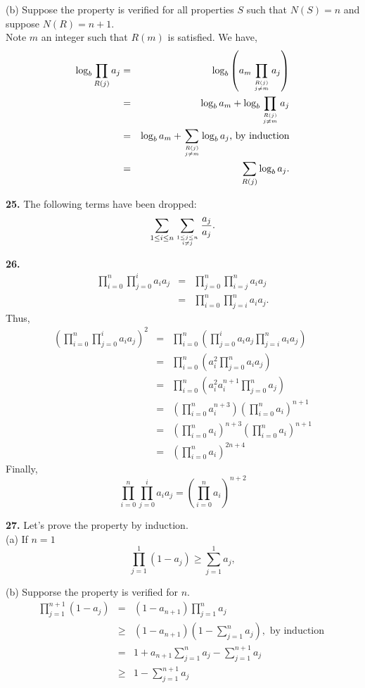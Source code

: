 \documentclass[a4paper,12pt]{article}
\newcommand{\newpar}[1]{\bigskip \noindent \textbf{#1.}}
\begin{document}
\noindent
(b) Suppose the property is verified for all properties $S$ such that
$N(S) = n$ and suppose $N(R) = n+1$.\\
Note $m$ an integer such that
$R(m)$ is satisfied.  We have,
\begin{eqnarray*}
\log_b\prod_{R(j)}a_j &=&
\log_b\left(a_m \prod_{R(j)\atop j \not= m}a_j\right)\\ &=&
\log_b a_m + \log_b \prod_{R(j)\atop  j \not= m}a_j\\&=&
\log_b a_m + \sum_{R(j)\atop j \not= m}\log_b a_j 
\mbox{, by induction}\\&=&
\sum_{R(j)}\log_ba_j.
\end{eqnarray*}

\newpar{25} The following terms have been dropped:
\[\sum_{1 \le i \le n}
\sum_{1 \le j \le n\atop i \not= j}
\frac{a_j}{a_j}.
\]

\newpar{26}
\begin{eqnarray*}
\prod_{i=0}^n \prod_{j=0}^i a_i a_j &=&
\prod_{j=0}^n \prod_{i=j}^n a_i a_j \\ &=&
\prod_{i=0}^n \prod_{j=i}^n a_i a_j.
\end{eqnarray*}
Thus,
\begin{eqnarray*}
\left( \prod_{i = 0}^n \prod_{j=0}^i a_i a_j\right)^2 &=&
\prod_{i=0}^n \left(
\prod_{j=0}^i a_i a_j \prod_{j=i}^n a_i a_j\right)\\ &=&
\prod_{i=0}^n \left(a_i^2
\prod_{j=0}^na_ia_j\right)\\&=&
\prod_{i=0}^n\left(a_i^2a_i^{n+1}\prod_{j=0}^na_j\right)\\&=&
\left(\prod_{i=0}^na_i^{n+3}\right)
\left(\prod_{i=0}^n a_i\right)^{n+1}\\&=&
\left(\prod_{i=0}^na_i\right)^{n+3}
\left(\prod_{i=0}^na_i\right)^{n+1}\\&=&
\left(\prod_{i=0}^na_i\right)^{2n+4}
\end{eqnarray*}
Finally,
\[\prod_{i=0}^n\prod_{j=0}^i a_i a_j =
\left(\prod_{i=0}^n a_i\right)^{n+2}\]

\newpar{27} Let's prove the property by induction.\\
(a) If $n = 1$
\[\prod_{j = 1}^1 (1 - a_j) \ge \sum_{j=1}^1 a_j,\]

\noindent
(b) Supporse the property is verified for $n$.
\begin{eqnarray*}
\prod_{j=1}^{n+1}(1 - a_j) &=& (1-a_{n+1})\prod_{j=1}^n a_j\\ &\ge&
(1-a_{n+1})\left(1-\sum_{j=1}^na_j\right),\mbox{ by induction }\\ &=&
1 + a_{n+1}\sum_{j=1}^na_j - \sum_{j=1}^{n+1}a_j\\ &\ge&
1-\sum_{j=1}^{n+1}a_j
\end{eqnarray*}
\end{document}
